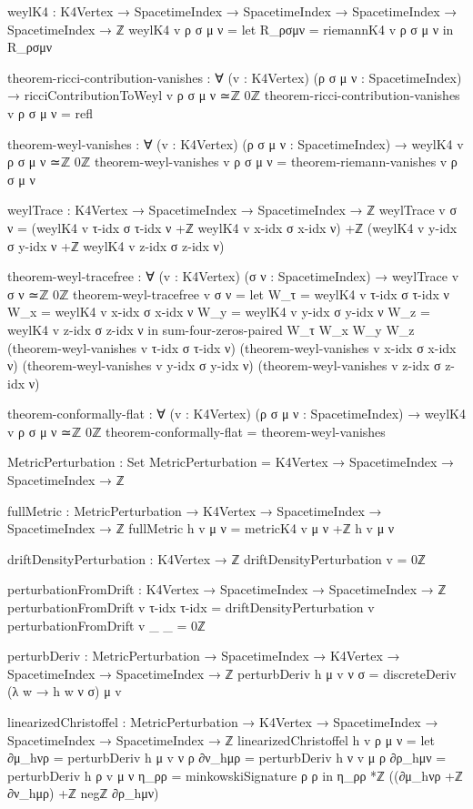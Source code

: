 \documentclass[11pt,a4paper]{book}
\begin{document}
\begin{code}
weylK4 : K4Vertex → SpacetimeIndex → SpacetimeIndex → 
         SpacetimeIndex → SpacetimeIndex → ℤ
weylK4 v ρ σ μ ν = 
  let R_ρσμν = riemannK4 v ρ σ μ ν
  in R_ρσμν

theorem-ricci-contribution-vanishes : ∀ (v : K4Vertex) (ρ σ μ ν : SpacetimeIndex) →
  ricciContributionToWeyl v ρ σ μ ν ≃ℤ 0ℤ
theorem-ricci-contribution-vanishes v ρ σ μ ν = refl

theorem-weyl-vanishes : ∀ (v : K4Vertex) (ρ σ μ ν : SpacetimeIndex) →
                         weylK4 v ρ σ μ ν ≃ℤ 0ℤ
theorem-weyl-vanishes v ρ σ μ ν = theorem-riemann-vanishes v ρ σ μ ν

weylTrace : K4Vertex → SpacetimeIndex → SpacetimeIndex → ℤ
weylTrace v σ ν = 
  (weylK4 v τ-idx σ τ-idx ν +ℤ weylK4 v x-idx σ x-idx ν) +ℤ
  (weylK4 v y-idx σ y-idx ν +ℤ weylK4 v z-idx σ z-idx ν)

theorem-weyl-tracefree : ∀ (v : K4Vertex) (σ ν : SpacetimeIndex) →
                          weylTrace v σ ν ≃ℤ 0ℤ
theorem-weyl-tracefree v σ ν = 
  let W_τ = weylK4 v τ-idx σ τ-idx ν
      W_x = weylK4 v x-idx σ x-idx ν
      W_y = weylK4 v y-idx σ y-idx ν
      W_z = weylK4 v z-idx σ z-idx ν
  in sum-four-zeros-paired W_τ W_x W_y W_z
       (theorem-weyl-vanishes v τ-idx σ τ-idx ν)
       (theorem-weyl-vanishes v x-idx σ x-idx ν)
       (theorem-weyl-vanishes v y-idx σ y-idx ν)
       (theorem-weyl-vanishes v z-idx σ z-idx ν)

theorem-conformally-flat : ∀ (v : K4Vertex) (ρ σ μ ν : SpacetimeIndex) →
  weylK4 v ρ σ μ ν ≃ℤ 0ℤ
theorem-conformally-flat = theorem-weyl-vanishes

MetricPerturbation : Set
MetricPerturbation = K4Vertex → SpacetimeIndex → SpacetimeIndex → ℤ

fullMetric : MetricPerturbation → K4Vertex → SpacetimeIndex → SpacetimeIndex → ℤ
fullMetric h v μ ν = metricK4 v μ ν +ℤ h v μ ν

driftDensityPerturbation : K4Vertex → ℤ
driftDensityPerturbation v = 0ℤ

perturbationFromDrift : K4Vertex → SpacetimeIndex → SpacetimeIndex → ℤ
perturbationFromDrift v τ-idx τ-idx = driftDensityPerturbation v
perturbationFromDrift v _     _     = 0ℤ

perturbDeriv : MetricPerturbation → SpacetimeIndex → K4Vertex → 
               SpacetimeIndex → SpacetimeIndex → ℤ
perturbDeriv h μ v ν σ = discreteDeriv (λ w → h w ν σ) μ v

linearizedChristoffel : MetricPerturbation → K4Vertex → 
                        SpacetimeIndex → SpacetimeIndex → SpacetimeIndex → ℤ
linearizedChristoffel h v ρ μ ν = 
  let ∂μ_hνρ = perturbDeriv h μ v ν ρ
      ∂ν_hμρ = perturbDeriv h ν v μ ρ
      ∂ρ_hμν = perturbDeriv h ρ v μ ν
      η_ρρ = minkowskiSignature ρ ρ
  in η_ρρ *ℤ ((∂μ_hνρ +ℤ ∂ν_hμρ) +ℤ negℤ ∂ρ_hμν)


\end{code}
\end{document}
